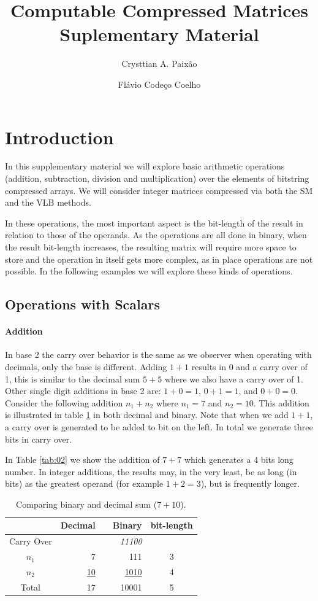 \documentclass[12pt]{article}
\title{Computable Compressed Matrices\\Suplementary Material}
\author{Crysttian A. Paixão \and Flávio Codeço Coelho}
\begin{document}
\maketitle

\section{Introduction}

In this supplementary material we will explore basic arithmetic operations
(addition, subtraction, division and multiplication) over the elements of
bitstring compressed arrays. We will consider integer matrices compressed via
both the SM and the VLB methods.

In these operations, the most important aspect is the bit-length of the result
in relation to those of the operands. As the operations are all done in
binary, when the result bit-length increases, the resulting matrix will require
more space to store and the operation in itself gets more complex, as in place
operations are not possible. In the following examples we will explore these
kinds of operations.

\subsection{Operations with Scalars}

\paragraph{Addition}

In base 2 the carry over  behavior is the same as we observer when operating
with decimals, only the base is different. Adding $1+1$ results in $0$ and a
carry over of 1, this is similar to the decimal sum $5+5$ where we also have a
carry over of 1. Other single digit additions in base 2 are: $1 + 0
= 1$, $0 + 1 = 1$, and $0 + 0 = 0$. Consider the following addition $n_1+n_2$
where $n_1=7$ and $n_2=10$. This addition is illustrated in table \ref{tab:01}
in both decimal and binary. Note that when we add $1+1$, a carry over is
generated to be added to bit on the left. In total we generate three bits in
carry over.

In Table \ref{tab:02} we show the addition of $7 + 7$ which generates a 4 bits
long number. In integer additions, the results may, in the very least, be as
long (in bits) as the greatest operand (for example $1+2=3$), but is frequently
longer.

\begin{table}[ht]
	\centering
    \caption{Comparing binary and decimal sum ($7+10$).}
    \begin{tabular}{crrrc}
    \hline
    	  & Decimal & & Binary & bit-length \\
    \hline      
    Carry Over& 	& & \textit{11100} & \\
    $n_1$ & 7   & & 111 & 3 \\
    $n_2$ & \underline{10}	& & \underline{1010} & 4 \\
    Total & 17	& & 10001 & 5 \\
    \hline
	\end{tabular}
    \label{tab:01}
\end{table}
\end{document}
